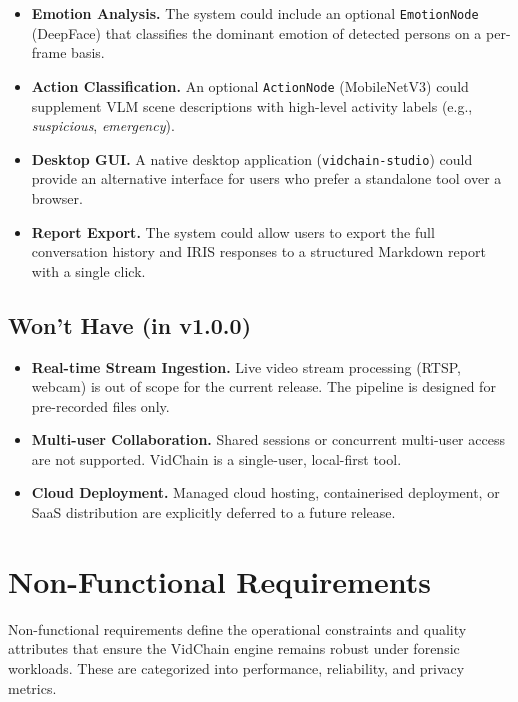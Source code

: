 \begin{itemize}
    \item \textbf{Emotion Analysis.} The system could include an optional \texttt{EmotionNode} (DeepFace) that classifies the dominant emotion of detected persons on a per-frame basis.

    \item \textbf{Action Classification.} An optional \texttt{ActionNode} (MobileNetV3) could supplement VLM scene descriptions with high-level activity labels (e.g., \textit{suspicious}, \textit{emergency}).

    \item \textbf{Desktop GUI.} A native desktop application (\texttt{vidchain-studio}) could provide an alternative interface for users who prefer a standalone tool over a browser.

    \item \textbf{Report Export.} The system could allow users to export the full conversation history and IRIS responses to a structured Markdown report with a single click.
\end{itemize}

\subsection{Won't Have (in v1.0.0)}

\begin{itemize}
    \item \textbf{Real-time Stream Ingestion.} Live video stream processing (RTSP, webcam) is out of scope for the current release. The pipeline is designed for pre-recorded files only.

    \item \textbf{Multi-user Collaboration.} Shared sessions or concurrent multi-user access are not supported. VidChain is a single-user, local-first tool.

    \item \textbf{Cloud Deployment.} Managed cloud hosting, containerised deployment, or SaaS distribution are explicitly deferred to a future release.
\end{itemize}

\section{Non-Functional Requirements}

Non-functional requirements define the operational constraints and quality attributes that ensure the VidChain engine remains robust under forensic workloads. These are categorized into performance, reliability, and privacy metrics.

